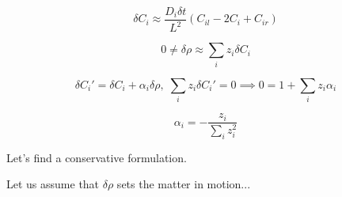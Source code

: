 \documentclass[aps,12pt]{revtex4}
\begin{document}
\begin{equation}
	\delta C_i \approx \dfrac{D_i\delta t}{L^2}\left(C_{il} - 2 C_i + C_{ir}\right) 
\end{equation}

\begin{equation}
	0 \not= \delta \rho \approx \sum_i z_i \delta C_i 
\end{equation}

\begin{equation}
	\delta C_i' = \delta C_i + \alpha_i \delta \rho, \; \sum_i z_i \delta C_i' = 0 \implies 0 = 1+\sum_i z_i \alpha_i
\end{equation}

\begin{equation}
	\alpha_i = -\dfrac{z_i}{\sum_iz_i^2}
\end{equation}

Let's find a conservative formulation.

Let us assume that $\delta \rho$ sets the matter in motion...
\end{document}
